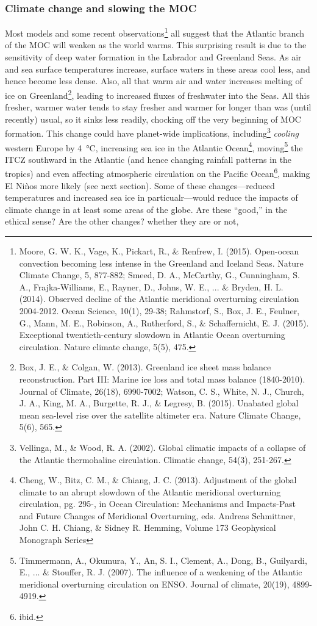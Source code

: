 {\subsubsection{Climate change and slowing the MOC}
Most models and some recent observations\footnote{Moore, G. W. K., Vage, K., Pickart, R., \& Renfrew, I. (2015). Open-ocean convection becoming less intense in the Greenland and Iceland Seas. Nature Climate Change, 5, 877-882; Smeed, D. A., McCarthy, G., Cunningham, S. A., Frajka-Williams, E., Rayner, D., Johns, W. E., ... \& Bryden, H. L. (2014). Observed decline of the Atlantic meridional overturning circulation 2004-2012. Ocean Science, 10(1), 29-38; Rahmstorf, S., Box, J. E., Feulner, G., Mann, M. E., Robinson, A., Rutherford, S., \& Schaffernicht, E. J. (2015). Exceptional twentieth-century slowdown in Atlantic Ocean overturning circulation. Nature climate change, 5(5), 475.} all suggest that the Atlantic branch of the MOC will weaken as the world warms. This surprising result is due to the sensitivity of deep water formation in the Labrador and Greenland Seas. As air and sea surface temperatures increase, surface waters in these areas cool less, and hence become less dense. Also, all that warm air and water increases melting of ice on Greenland\footnote{Box, J. E., \& Colgan, W. (2013). Greenland ice sheet mass balance reconstruction. Part III: Marine ice loss and total mass balance (1840-2010). Journal of Climate, 26(18), 6990-7002; Watson, C. S., White, N. J., Church, J. A., King, M. A., Burgette, R. J., \& Legresy, B. (2015). Unabated global mean sea-level rise over the satellite altimeter era. Nature Climate Change, 5(6), 565.}, leading to increased fluxes of freshwater into the Seas. All this fresher, warmer water tends to stay fresher and warmer for longer than was (until recently) usual, so it sinks less readily, chocking off the very beginning of MOC formation. This change could have planet-wide implications, including\footnote{Vellinga, M., \& Wood, R. A. (2002). Global climatic impacts of a collapse of the Atlantic thermohaline circulation. Climatic change, 54(3), 251-267.} \emph{cooling} western Europe by \SI{4}{\celsius}, increasing sea ice in the Atlantic Ocean\footnote{Cheng, W., Bitz, C. M., \& Chiang, J. C. (2013). Adjustment of the global climate to an abrupt slowdown of the Atlantic meridional overturning circulation, pg. 295-, in Ocean Circulation: Mechanisms and Impacts-Past and Future Changes of Meridional Overturning, eds. Andreas Schmittner, John C. H. Chiang, \& Sidney R. Hemming, Volume 173 Geophysical Monograph Series}, moving\footnote{Timmermann, A., Okumura, Y., An, S. I., Clement, A., Dong, B., Guilyardi, E., ... \& Stouffer, R. J. (2007). The influence of a weakening of the Atlantic meridional overturning circulation on ENSO. Journal of climate, 20(19), 4899-4919.} the ITCZ southward in the Atlantic (and hence changing rainfall patterns in the tropics) and even affecting atmospheric circulation on the Pacific Ocean\footnote{ibid.}, making El Ni\`nos more likely (see next section). Some of these changes---reduced temperatures and increased sea ice in particualr---would reduce the impacts of climate change in at least some areas of the globe. Are these ``good,'' in the ethical sense? Are the other changes? whether they are or not, }
